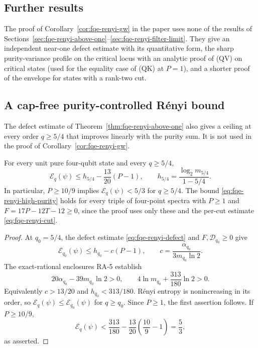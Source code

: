 \subsection*{Further results}
\noindent The proof of Corollary~\ref{cor:fqe-renyi-gw} in the paper uses none of the results of
Sections~\ref{sec:fqe-renyi-above-one}--\ref{sec:fqe-renyi-filter-limit}. They give an independent near-one defect estimate
with its quantitative form, the sharp purity-variance profile on the critical locus with an analytic proof of (QV) on critical
states (used for the equality case of (QK) at $P=1$), and a shorter proof of the envelope for states with a rank-two cut.




\subsection{A cap-free purity-controlled R\'enyi bound}\label{sec:fqe-renyi-purity-bound}
The defect estimate of Theorem~\ref{thm:fqe-renyi-above-one} also gives a ceiling at every order $q\ge5/4$ that
improves linearly with the purity sum. It is not used in the proof of Corollary~\ref{cor:fqe-renyi-gw}.

\begin{corollary}
\label{cor:fqe-renyi-purity}
For every unit pure four-qubit state and every $q\ge5/4$,
\[
\boxed{\qquad \mathcal E_q(\psi)\le h_{5/4}-\frac{13}{20}(P-1),
\qquad h_{5/4}=\frac{\log_2m_{5/4}}{1-5/4}.\qquad}
\tag{RH}\label{eq:fqe-renyi-high-purity}
\]
In particular, $P\ge10/9$ implies $\mathcal E_q(\psi)<5/3$
for $q\ge5/4$. The bound \eqref{eq:fqe-renyi-high-purity} holds for every triple of four-point spectra with
$P\ge1$ and $F=17P-12T-12\ge0$, since the proof uses only these and the per-cut estimate
\eqref{eq:fqe-renyi-cut}.
\end{corollary}
\begin{proof}
At $q_0=5/4$, the defect estimate \eqref{eq:fqe-renyi-defect}
and $F,\mathcal D_{q_0}\ge0$ give
\[
\mathcal E_{q_0}(\psi)\le h_{q_0}-c(P-1),
\qquad c=\frac{\alpha_{q_0}}{3m_{q_0}\ln2}.
\]
The exact-rational enclosures RA-5 establish
\[
20\alpha_{q_0}-39m_{q_0}\ln2>0,\qquad
4\ln m_{q_0}+\frac{313}{180}\ln2>0.
\]
Equivalently $c>13/20$ and $h_{q_0}<313/180$.
R\'enyi entropy is nonincreasing in its order, so
$\mathcal E_q(\psi)\le\mathcal E_{q_0}(\psi)$ for $q\ge q_0$.
Since $P\ge1$, the first assertion follows. If $P\ge10/9$,
\[
\mathcal E_q(\psi)<\frac{313}{180}
-\frac{13}{20}\left(\frac{10}{9}-1\right)=\frac53,
\]
as asserted.
\end{proof}

